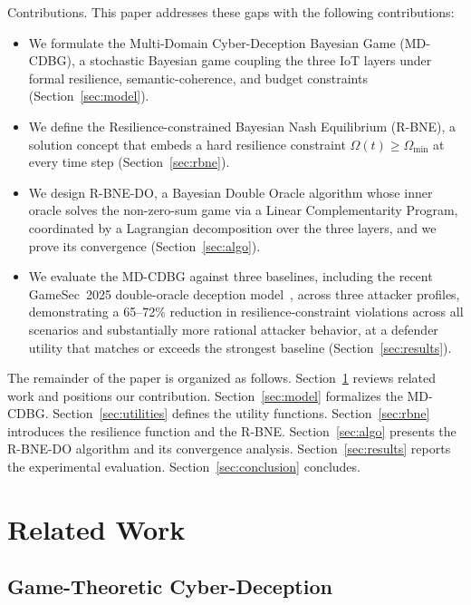 \documentclass[conference]{IEEEtran}
\begin{document}
Contributions. This paper addresses these gaps with the following
contributions:
\begin{itemize}
\item We formulate the Multi-Domain Cyber-Deception Bayesian Game
(MD-CDBG), a stochastic Bayesian game coupling the three IoT layers under
formal resilience, semantic-coherence, and budget constraints
(Section~\ref{sec:model}).
\item We define the Resilience-constrained Bayesian Nash Equilibrium
(R-BNE), a solution concept that embeds a hard resilience constraint
$\Omega(t)\geq\Omega_{\min}$ at every time step (Section~\ref{sec:rbne}).
\item We design R-BNE-DO, a Bayesian Double Oracle algorithm whose
inner oracle solves the non-zero-sum game via a Linear Complementarity Program,
coordinated by a Lagrangian decomposition over the three layers, and we prove
its convergence (Section~\ref{sec:algo}).
\item We evaluate the MD-CDBG against three baselines, including the recent
GameSec~2025 double-oracle deception model~\cite{asghar2025}, across three
attacker profiles, demonstrating a 65--72\% reduction in resilience-constraint
violations across all scenarios and substantially more rational attacker
behavior, at a defender utility that matches or exceeds the strongest baseline
(Section~\ref{sec:results}).
\end{itemize}

The remainder of the paper is organized as follows.
Section~\ref{sec:related} reviews related work and positions our contribution.
Section~\ref{sec:model} formalizes the MD-CDBG. Section~\ref{sec:utilities}
defines the utility functions. Section~\ref{sec:rbne} introduces the resilience
function and the R-BNE. Section~\ref{sec:algo} presents the R-BNE-DO algorithm
and its convergence analysis. Section~\ref{sec:results} reports the
experimental evaluation. Section~\ref{sec:conclusion} concludes.

\section{Related Work}
\label{sec:related}

\subsection{Game-Theoretic Cyber-Deception}
\end{document}
